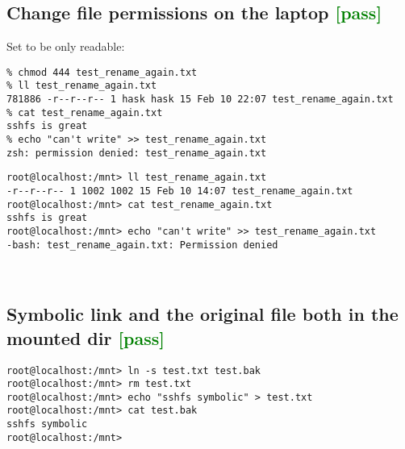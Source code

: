 \documentclass[a4paper]{report}
\begin{document}
\begin{enumerate}
\subsection{Change file permissions on the laptop \textcolor{green}{[pass]}}
Set to be only readable:
\begin{lstlisting}
% chmod 444 test_rename_again.txt
% ll test_rename_again.txt      
781886 -r--r--r-- 1 hask hask 15 Feb 10 22:07 test_rename_again.txt
% cat test_rename_again.txt 
sshfs is great
% echo "can't write" >> test_rename_again.txt
zsh: permission denied: test_rename_again.txt
\end{lstlisting}
\begin{lstlisting}
root@localhost:/mnt> ll test_rename_again.txt 
-r--r--r-- 1 1002 1002 15 Feb 10 14:07 test_rename_again.txt
root@localhost:/mnt> cat test_rename_again.txt 
sshfs is great
root@localhost:/mnt> echo "can't write" >> test_rename_again.txt 
-bash: test_rename_again.txt: Permission denied
\end{lstlisting}\null\\
\subsection{Symbolic link and the original file both in the mounted dir 
            \textcolor{green}{[pass]}}
\begin{lstlisting}
root@localhost:/mnt> ln -s test.txt test.bak
root@localhost:/mnt> rm test.txt 
root@localhost:/mnt> echo "sshfs symbolic" > test.txt
root@localhost:/mnt> cat test.bak 
sshfs symbolic
root@localhost:/mnt> 
\end{lstlisting}\null\\

\end{enumerate}
\end{document}
